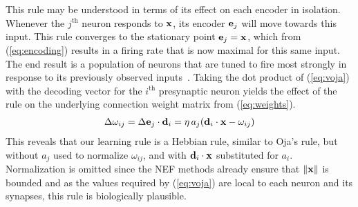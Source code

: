 This rule may be understood in terms of its effect on each encoder in isolation.
Whenever the $j^\mathrm{th}$ neuron responds to $\mathbf{x}$, its encoder $\mathbf{e}_j$ will move towards this input.
This rule converges to the stationary point $\mathbf{e}_j = \mathbf{x}$, which from (\ref{eq:encoding}) results in a firing rate that is now maximal for this same input.
The end result is a population of neurons that are tuned to fire most strongly in response to its previously observed inputs~\citep{voelker2014a}.
%
Taking the dot product of (\ref{eq:voja}) with the decoding vector for the $i^\mathrm{th}$ presynaptic neuron yields the effect of the rule on the underlying connection weight matrix from (\ref{eq:weights}).
%
\begin{align}
  \label{eq:voja-weights}
  \Delta \omega_{ij} = \Delta \mathbf{e}_j \cdot \mathbf{d}_i = \eta \, a_j (\mathbf{d}_i \cdot \mathbf{x} - \omega_{ij})
\end{align}
%
This reveals that our learning rule is a Hebbian rule, similar to Oja's rule, but without $a_j$ used to normalize $\omega_{ij}$, and with $\mathbf{d}_i \cdot \mathbf{x}$ substituted for $a_i$.
Normalization is omitted since the NEF methods already ensure that $\|\mathbf{x}\|$ is bounded and as the values required by (\ref{eq:voja}) are local to each neuron and its synapses, this rule is biologically plausible.
